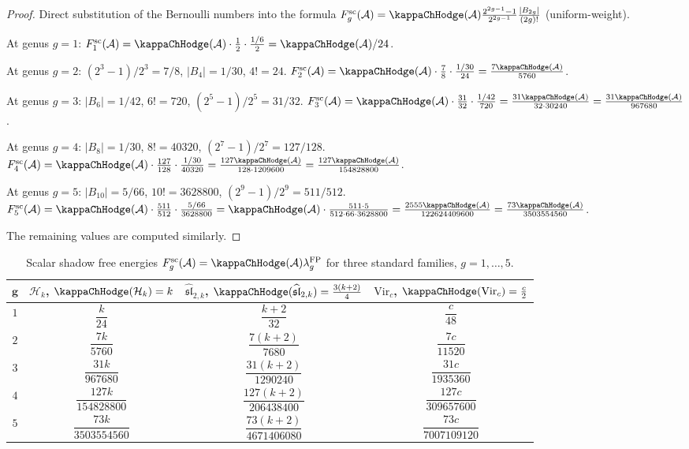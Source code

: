 \begin{proof}
Direct substitution of the Bernoulli numbers into the
formula
$F_g^{\mathrm{sc}}(\cA)=\kappaChHodge(\cA) \frac{2^{2g-1}-1}{2^{2g-1}} \frac{|B_{2g}|}{(2g)!}$
\textup{(}uniform-weight\textup{)}.

At genus $g = 1$: $F_1^{\mathrm{sc}}(\cA) = \kappaChHodge(\cA) \cdot \frac{1}{2} \cdot \frac{1/6}{2} = \kappaChHodge(\cA)/24$.

At genus $g = 2$: $(2^3{-}1)/2^3 = 7/8$, $|B_4| = 1/30$, $4! = 24$. $F_2^{\mathrm{sc}}(\cA) = \kappaChHodge(\cA) \cdot \frac{7}{8} \cdot \frac{1/30}{24} = \frac{7\kappaChHodge(\cA)}{5760}$.

At genus $g = 3$: $|B_6| = 1/42$, $6! = 720$, $(2^5 - 1)/2^5 = 31/32$. $F_3^{\mathrm{sc}}(\cA) = \kappaChHodge(\cA) \cdot \frac{31}{32} \cdot \frac{1/42}{720} = \frac{31\kappaChHodge(\cA)}{32 \cdot 30240} = \frac{31\kappaChHodge(\cA)}{967680}$.

At genus $g = 4$: $|B_8| = 1/30$, $8! = 40320$, $(2^7 - 1)/2^7 = 127/128$. $F_4^{\mathrm{sc}}(\cA) = \kappaChHodge(\cA) \cdot \frac{127}{128} \cdot \frac{1/30}{40320} = \frac{127\kappaChHodge(\cA)}{128 \cdot 1209600} = \frac{127\kappaChHodge(\cA)}{154828800}$.

At genus $g = 5$: $|B_{10}| = 5/66$, $10! = 3628800$, $(2^9 - 1)/2^9 = 511/512$. $F_5^{\mathrm{sc}}(\cA) = \kappaChHodge(\cA) \cdot \frac{511}{512} \cdot \frac{5/66}{3628800} = \kappaChHodge(\cA) \cdot \frac{511 \cdot 5}{512 \cdot 66 \cdot 3628800} = \frac{2555\kappaChHodge(\cA)}{122624409600} = \frac{73\kappaChHodge(\cA)}{3503554560}$.

The remaining values are computed similarly.
\end{proof}

\begin{table}[ht]
\centering
\caption{Scalar shadow free energies $F_g^{\mathrm{sc}}(\cA)=\kappaChHodge(\cA)\lambda_g^{\mathrm{FP}}$ for three standard families, $g = 1, \ldots, 5$.}
\renewcommand{\arraystretch}{1.5}
{\footnotesize
\begin{tabular}{|c|c|c|c|}
\hline
$\boldsymbol{g}$ & $\mathcal{H}_k$, $\kappaChHodge(\mathcal{H}_k) = k$ & $\widehat{\mathfrak{sl}}_{2,k}$, $\kappaChHodge(\widehat{\mathfrak{sl}}_{2,k}) = \frac{3(k+2)}{4}$ & $\mathrm{Vir}_c$, $\kappaChHodge(\mathrm{Vir}_c) = \frac{c}{2}$ \\
\hline
$1$ & $\dfrac{k}{24}$ & $\dfrac{k+2}{32}$ & $\dfrac{c}{48}$ \\[6pt]
\hline
$2$ & $\dfrac{7k}{5760}$ & $\dfrac{7(k+2)}{7680}$ & $\dfrac{7c}{11520}$ \\[6pt]
\hline
$3$ & $\dfrac{31k}{967680}$ & $\dfrac{31(k+2)}{1290240}$ & $\dfrac{31c}{1935360}$ \\[6pt]
\hline
$4$ & $\dfrac{127k}{154828800}$ & $\dfrac{127(k+2)}{206438400}$ & $\dfrac{127c}{309657600}$ \\[6pt]
\hline
$5$ & $\dfrac{73k}{3503554560}$ & $\dfrac{73(k+2)}{4671406080}$ & $\dfrac{73c}{7007109120}$ \\[6pt]
\hline
\end{tabular}}
\end{table}

